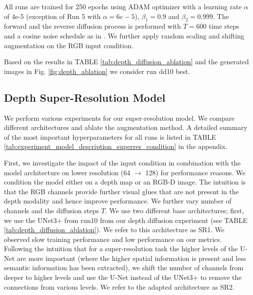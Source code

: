 All runs are trained for 250 epochs using ADAM optimizer with a learning rate $\alpha$ of 4e-5 (exception of Run 5 with $\alpha=6e-5$), $\beta_1=0.9$ and $\beta_2=0.999$. The forward and the reverse diffusion process is performed with $T=600$ time steps and a cosine noise schedule as in \cite{nichol_improved_2021}. We further apply random scaling and shifting augmentation on the RGB input condition. 

Based on the results in TABLE \ref{tab:depth_diffusion_ablation} and the generated images in Fig. \ref{fig:depth_ablation} we consider run dd10 best.

\subsection{Depth Super-Resolution Model} \label{subsec:experiements_superresolution}
We perform various experiments for our super-resolution model. We compare different architectures and ablate the augmentation method. A detailed summary of the most important hyperparameters for all runs is listed in TABLE \ref{tab:experiment_model_description_superres_condition} in the appendix.

First, we investigate the impact of the input condition in combination with the model architecture on lower resolution (64 $\rightarrow$ 128) for performance reasons. We condition the model either on a depth map or an RGB-D image. The intuition is that the RGB channels provide further visual glues that are not present in the depth modality and hence improve performance. We further vary number of channels and the diffusion steps $T$. We use two different base architectures; first, we use the UNet3+ from run10 from our depth diffusion experiment (see TABLE \ref{tab:depth_diffusion_ablation}). We refer to this architecture as SR1. We observed slow training performance and low performance on our metrics. Following the intuition that for a super-resolution task the higher levels of the U-Net are more important (where the higher spatial information is present and less semantic information has been extracted), we shift the number of channels from deeper to higher levels and use the U-Net instead of the UNet3+ to remove the connections from various levels. We refer to the adapted architecture as SR2.

